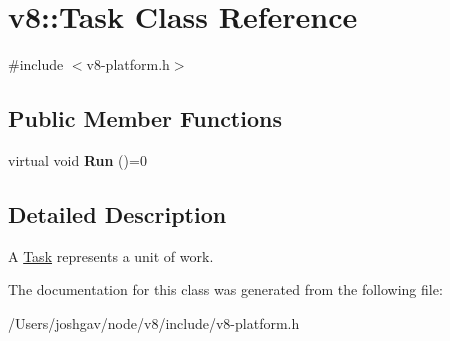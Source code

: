 \hypertarget{classv8_1_1_task}{}\section{v8\+:\+:Task Class Reference}
\label{classv8_1_1_task}


{\ttfamily \#include $<$v8-\/platform.\+h$>$}

\subsection*{Public Member Functions}
\begin{DoxyCompactItemize}
\item 
virtual void {\bfseries Run} ()=0\hypertarget{classv8_1_1_task_a6bd5bda0e357fcc2e727bf7b0170f99a}{}\label{classv8_1_1_task_a6bd5bda0e357fcc2e727bf7b0170f99a}

\end{DoxyCompactItemize}


\subsection{Detailed Description}
A \hyperlink{classv8_1_1_task}{Task} represents a unit of work. 

The documentation for this class was generated from the following file\+:\begin{DoxyCompactItemize}
\item 
/\+Users/joshgav/node/v8/include/v8-\/platform.\+h\end{DoxyCompactItemize}

